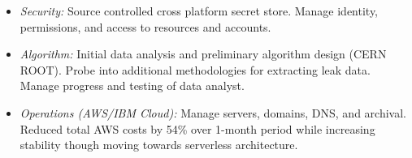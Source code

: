 {{\begin{itemize}
        Original architecture for MVP designed with transitioned to Serverless for improved scalability and cost reduction. Archival and forwarding applications for data flow. Limited processing power REST backend on microcontroller hosting REST API to low level functions.
      \item \emph{Security:}
        Source controlled cross platform secret store. Manage identity, permissions, and access to resources and accounts.
      \item \emph{Algorithm:}
        Initial data analysis and preliminary algorithm design (CERN ROOT). Probe into additional methodologies for extracting leak data. Manage progress and testing of data analyst. 
      \item \emph{Operations (AWS/IBM Cloud):}
        Manage servers, domains, DNS, and archival. Reduced total AWS costs by 54\% over 1-month period while increasing stability though moving towards serverless architecture.
    \end{itemize}
    }
}

